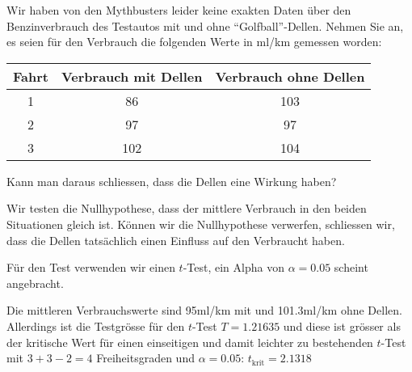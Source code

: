 Wir haben von den Mythbusters leider keine exakten Daten über den
Benzinverbrauch des Testautos mit und ohne ``Golfball''-Dellen.
Nehmen Sie an, es seien für den Verbrauch die folgenden Werte in ml/km
gemessen worden:
\begin{center}
\begin{tabular}{ccc}
\hline
Fahrt&Verbrauch mit Dellen&Verbrauch ohne Dellen\\
\hline
1&86&103\\
2&97&97\\
3&102&104\\
\hline
\end{tabular}
\end{center}
Kann man daraus schliessen, dass die Dellen eine Wirkung haben?


\begin{loesung}
Wir testen die Nullhypothese, dass der mittlere Verbrauch in den
beiden Situationen gleich ist.
Können wir die Nullhypothese verwerfen, schliessen wir, dass die
Dellen tatsächlich einen Einfluss auf den Verbraucht haben.

Für den Test verwenden wir einen $t$-Test, ein Alpha von
$\alpha=0.05$ scheint angebracht.

Die mittleren Verbrauchswerte sind 95ml/km mit und 101.3ml/km ohne
Dellen.
Allerdings ist die Testgrösse für den $t$-Test
$T=1.21635$ und diese ist grösser als der kritische Wert für
einen einseitigen und damit leichter zu bestehenden $t$-Test mit
$3+3-2=4$ Freiheitsgraden und
$\alpha=0.05$: $t_{\text{krit}}=2.1318$
\end{loesung}

